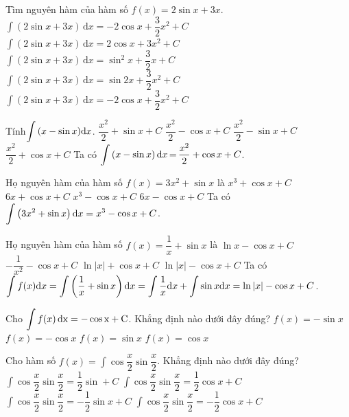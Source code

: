 \begin{ex}%
	Tìm nguyên hàm của hàm số $f(x)=2\sin x+3x$.
	\choice
	{\True $\displaystyle\int{\left(2\sin x+3x\right)\mathrm{\,d}x=-2\cos x+\dfrac{3}{2}{x^2}+C}$}
	{$\displaystyle\int{\left(2\sin x+3x\right)\mathrm{\,d}x=2\cos x+3x^2+C}$}
	{$\displaystyle\int{\left(2\sin x+3x\right)\mathrm{\,d}x=\sin^2x+\dfrac{3}{2}x+C}$}
	{$\displaystyle\int{\left(2\sin x+3x\right)\mathrm{\,d}x=\sin 2x+\dfrac{3}{2}{x^2}+C}$}
	\loigiai
	{
		$\displaystyle\int{\left(2\sin x+3x\right)\mathrm{\,d}x}=-2\cos x+\dfrac{3}{2}{x^2}+C$}
\end{ex}

\begin{ex}%
	Tính$\displaystyle\int{\left(x-\sin x\right)}{\rm{d}}x$.
	\choice
	{$\dfrac{x^2}{2}+\sin x+C$}
	{$\dfrac{x^2}{2}-\cos x+C$}
	{$\dfrac{x^2}{2}-\sin x+C$}
	{\True $\dfrac{x^2}{2}+\cos x+C$}
	\loigiai
	{
		Ta có $\displaystyle\int{\left(x-\sin x\right){\rm{d}}x\,\rm{=}\,}\dfrac{x^2}{2}+\cos x+C$.}
\end{ex}
\begin{ex}%
	Họ nguyên hàm của hàm số $f(x)=3x^2+\sin x$ là
	\choice
	{$x^3+\cos x+C$}
	{$6x+\cos x+C$}
	{\True $x^3-\cos x+C$}
	{$6x-\cos x+C$}
	\loigiai
	{
		Ta có $\displaystyle\int\left(3x^2+\sin x\right){\rm{d}}x=x^3-\cos x+C$.}
\end{ex}
\begin{ex}%
	Họ nguyên hàm của hàm số $ f(x)=\dfrac{1}{x}+\sin x$ là
	\choice
	{$\ln x-\cos x+C$}
	{$-\dfrac{1}{x^2}-\cos x+C$}
	{$\ln \left| x\right|+\cos x+C$}
	{\True $\ln \left| x\right|-\cos x+C$}
	\loigiai
	{
		Ta có $\displaystyle\int{f(x){\rm{d}}x}=\displaystyle\int{\left(\dfrac{1}{x}+\sin x\right){\rm{d}}x}=\displaystyle\int{\dfrac{1}{x}{\rm{d}}x}+\displaystyle\int{\sin x{\rm{d}}x}=\ln \left| x\right|-\cos x+C$.}
\end{ex}
\begin{ex}%
	Cho $\displaystyle\int{f(x)}\,\rm{d}x=-\cos x+C$. Khẳng định nào dưới đây đúng?
	\choice
	{$ f(x)=-\sin x$}
	{$ f(x)=-\cos x$}
	{\True $ f(x)=\sin x$}
	{$ f(x)=\cos x$}
\end{ex}
\begin{ex}%
	Cho hàm số $ f(x)=\displaystyle\int{\cos\dfrac{x}{2}\sin\dfrac{x}{2}}$. Khẳng định nào dưới đây đúng?
	\choice
	{$\displaystyle\int{\cos\dfrac{x}{2}\sin\dfrac{x}{2}}=\dfrac{1}{2}\sin+C$}
	{$\displaystyle\int{\cos\dfrac{x}{2}\sin\dfrac{x}{2}}=\dfrac{1}{2}\cos x+C$}
	{$\displaystyle\int{\cos\dfrac{x}{2}\sin\dfrac{x}{2}}=-\dfrac{1}{2}\sin x+C$}
	{\True $\displaystyle\int{\cos\dfrac{x}{2}\sin\dfrac{x}{2}}=-\dfrac{1}{2}\cos x+C$}
\end{ex}
